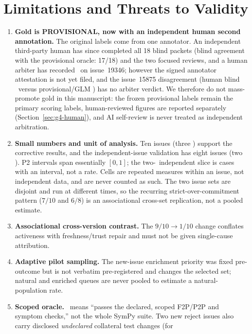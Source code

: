 \section{Limitations and Threats to Validity}
\label{sec:threats}

\begin{enumerate}[leftmargin=1.7em,itemsep=3pt,topsep=3pt]
  \item \textbf{Gold is PROVISIONAL, now with an independent human second
  annotation.} The original labels come from one annotator. An independent
  third-party human has since completed all 18 blind packets (blind agreement
  with the provisional oracle: 17/18) and the two focused reviews, and a human
  arbiter has recorded \REJECT\ on issue~19346; however the signed annotator
  attestation is not yet filed, and the issue~15875 disagreement (human blind
  \ACCEPT\ versus provisional/GLM \REJECT) has no arbiter verdict. We therefore
  do not mass-promote gold in this manuscript: the frozen provisional labels
  remain the primary scoring labels, human-reviewed figures are reported
  separately (Section~\ref{sec:g4-human}), and AI self-review is never treated
  as independent arbitration.
  \item \textbf{Small numbers and unit of analysis.} Ten issues (three
  \REJECT) support the corrective results, and the independent-issue
  validation has eight issues (two \REJECT). P2 intervals span essentially
  $[0,1]$; the two-\REJECT\ independent slice is cases with an interval, not a
  rate. Cells are repeated measures within an issue, not independent data,
  and are never counted as such. The two issue sets are disjoint and run at
  different times, so the recurring strict-over-commitment pattern
  ($7/10$ and $6/8$) is an associational cross-set replication, not a pooled
  estimate.
  \item \textbf{Associational cross-version contrast.} The $9/10\to1/10$
  change conflates activeness with freshness/trust repair and must not be given
  single-cause attribution.
  \item \textbf{Adaptive pilot sampling.} The new-issue enrichment priority was
  fixed pre-outcome but is not verbatim pre-registered and changes the selected
  set; natural and enriched queues are never pooled to estimate a
  natural-population rate.
  \item \textbf{Scoped oracle.} \ACCEPT\ means ``passes the declared, scoped
  F2P/P2P and symptom checks,'' not the whole SymPy suite. Two new reject
  issues also carry disclosed \emph{undeclared} collateral test changes (for

\end{enumerate}
